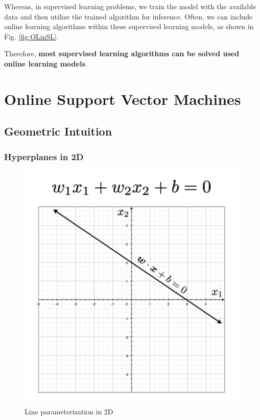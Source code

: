 \documentclass[11pt]{article}
\begin{document}
Whereas, in supervised learning problems, we train the model with the available data and then utilize the trained algorithm for inference. Often, we can include online learning algorithms within these supervised learning models, as shown in Fig. \ref{fig:OLinSL}.

Therefore, \textbf{most supervised learning algorithms can be solved used online learning models}.

\section{Online Support Vector Machines}

\subsection{Geometric Intuition}
\subsubsection{Hyperplanes in 2D}

\begin{figure}[h]
    \centering
    \includegraphics[scale = 0.50]{figures/2DLineParameterization.png}
    \caption{Line parameterization in 2D}
    \label{fig:2DParameterization}
\end{figure}
\end{document}
